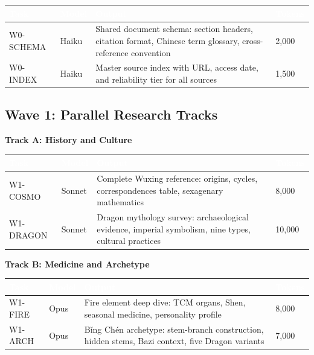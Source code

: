 \documentclass[11pt,letterpaper]{article}
\newcommand{\tableheader}[1]{\textbf{\sffamily\textcolor{white}{#1}}}
\begin{document}
\begin{center}
\begin{tabularx}{\textwidth}{L{2.5cm}L{1.5cm}XC{1.5cm}}
\toprule
{}
\tableheader{Task} & \tableheader{Model} & \tableheader{Output} & \tableheader{Tokens} \\
\midrule
W0-SCHEMA & Haiku & Shared document schema: section headers, citation format, Chinese term glossary, cross-reference convention & 2,000 \\
W0-INDEX & Haiku & Master source index with URL, access date, and reliability tier for all sources & 1,500 \\
\bottomrule
\end{tabularx}
\end{center}

\subsection{Wave 1: Parallel Research Tracks}

\textbf{Track A: History and Culture}

\begin{center}
\begin{tabularx}{\textwidth}{L{2.5cm}L{1.5cm}XC{1.5cm}}
\toprule
{}
\tableheader{Task} & \tableheader{Model} & \tableheader{Output} & \tableheader{Tokens} \\
\midrule
W1-COSMO & Sonnet & Complete Wuxing reference: origins, cycles, correspondences table, sexagenary mathematics & 8,000 \\
W1-DRAGON & Sonnet & Dragon mythology survey: archaeological evidence, imperial symbolism, nine types, cultural practices & 10,000 \\
\bottomrule
\end{tabularx}
\end{center}

\textbf{Track B: Medicine and Archetype}

\begin{center}
\begin{tabularx}{\textwidth}{L{2.5cm}L{1.5cm}XC{1.5cm}}
\toprule
{}
\tableheader{Task} & \tableheader{Model} & \tableheader{Output} & \tableheader{Tokens} \\
\midrule
W1-FIRE & Opus & Fire element deep dive: TCM organs, Shen, seasonal medicine, personality profile & 8,000 \\
W1-ARCH & Opus & Bǐng Chén archetype: stem-branch construction, hidden stems, Bazi context, five Dragon variants & 7,000 \\
\bottomrule
\end{tabularx}
\end{center}
\end{document}

